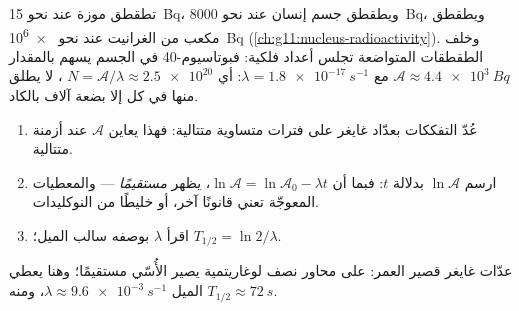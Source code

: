 \begin{example}\label{ex:g12:radioactive-decay:body}
تطقطق موزة عند نحو \qty{15}{Bq}، ويطقطق جسم إنسان عند نحو
\qty{8000}{Bq}، ويطقطق  مكعب من الغرانيت عند نحو \qty{e6}{Bq}
(\cref{ch:g11:nucleus-radioactivity}). وخلف الطقطقات المتواضعة تجلس
أعداد فلكية: فبوتاسيوم-40 في الجسم يسهم بالمقدار
$\mathcal A \approx \qty{4.4e3}{Bq}$ مع $\lambda =
\qty{1.8e-17}{s^{-1}}$: أي $N = \mathcal A/\lambda \approx \num{2.5e20}$
، لا يطلق منها في كل  إلا بضعة آلاف بالكاد.
\end{example}

\begin{method}\label{met:g12:radioactive-decay:semilog}
\begin{enumerate}
  \item عُدّ التفككات بعدّاد غايغر على فترات متساوية
        متتالية: فهذا يعاين $\mathcal A$ عند أزمنة متتالية.
  \item ارسم $\ln \mathcal A$ بدلالة $t$: فبما أن
        $\ln \mathcal A = \ln \mathcal A_0 - \lambda t$، يظهر  \emph{مستقيمًا} --- والمعطيات المعوجّة تعني
        قانونًا آخر، أو خليطًا من النوكليدات.
  \item اقرأ $\lambda$ بوصفه سالب الميل؛ $T_{1/2} = \ln 2/\lambda$.
\end{enumerate}
\end{method}

\begin{omfigure}

{\small عدّات غايغر  قصير العمر: على محاور نصف لوغاريتمية يصير
الأُسّي مستقيمًا؛ وهنا يعطي الميل
$\lambda \approx \qty{9.6e-3}{s^{-1}}$، ومنه $T_{1/2} \approx \qty{72}{s}$.}
\end{omfigure}

